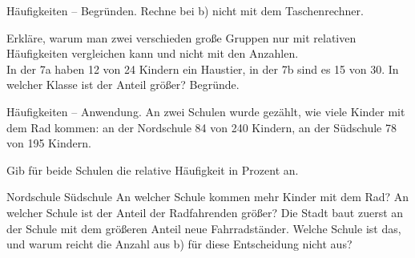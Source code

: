 \begin{aufgabe}{Häufigkeiten -- Begründen. Rechne bei b) nicht mit dem Taschenrechner.}
\begin{teile}
\teil Erkläre, warum man zwei verschieden große Gruppen nur mit relativen Häufigkeiten vergleichen kann und nicht mit den Anzahlen. \\[12pt]
\teil In der 7a haben 12 von 24 Kindern ein Haustier, in der 7b sind es 15 von 30. In welcher Klasse ist der Anteil größer? Begründe. \\[12pt]
\end{teile}
\end{aufgabe}

\begin{aufgabe}{Häufigkeiten -- Anwendung. An zwei Schulen wurde gezählt, wie viele Kinder mit dem Rad kommen: an der Nordschule 84 von 240 Kindern, an der Südschule 78 von 195 Kindern.}
\begin{teile}
\teil Gib für beide Schulen die relative Häufigkeit in Prozent an.
\par Nordschule \leerfeld[\%] \quad Südschule \leerfeld[\%]
\teil An welcher Schule kommen mehr Kinder mit dem Rad? \leerfeld
\teil An welcher Schule ist der Anteil der Radfahrenden größer? \leerfeld
\teil Die Stadt baut zuerst an der Schule mit dem größeren Anteil neue Fahrradständer. Welche Schule ist das, und warum reicht die Anzahl aus b) für diese Entscheidung nicht aus? \\[12pt]
\end{teile}
\end{aufgabe}
